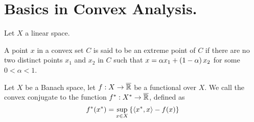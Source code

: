 \chapter{Basics in Convex Analysis.}

\begin{definition}[Convexity]
Let $X$ a linear space. 
\end{definition}
\begin{definition}
\end{definition}
\begin{definition}
\end{definition}

\begin{theorem}
\end{theorem}

\begin{theorem}
\end{theorem}


\begin{definition}
A point $x$ in a convex set $C$ is said to be an extreme point of $C$ if there are no two distinct points $x_1$ and $x_2$ in $C$ such that $x = \alpha x_1 + \left( 1-\alpha \right)x_2$ for some $0<\alpha <1$.
\end{definition}

\begin{definition}
Let $X$ be a Banach space, let $f:X\rightarrow \overline{\mathbb{R}}$ be a functional over $X$. We call the convex conjugate to the function ${f}^*: {X}^*\rightarrow \overline{\mathbb{R}}$, defined as
\begin{equation*}
	{f}^*({x}^*)=\sup_{x\in X} \left\lbrace \left\langle {x}^*, x \right\rangle-f(x) \right\rbrace
\end{equation*}	
\end{definition}

